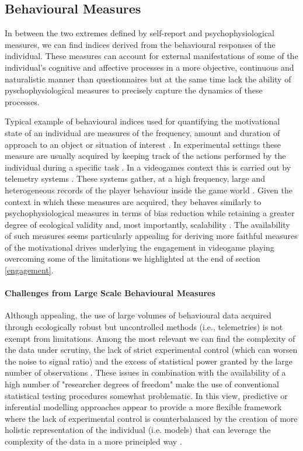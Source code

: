 \subsection{Behavioural Measures}
\label{behavioural_indices}
In between the two extremes defined by self-report and psychophysiological measures, we can find indices derived from the behavioural responses of the individual. These measures can account for external manifestations of some of the individual's cognitive and affective processes in a more objective, continuous and naturalistic manner than questionnaires but at the same time lack the ability of pyschophysiological measures to precisely capture the dynamics of these processes. 

Typical example of behavioural indices used for quantifying the motivational state of an individual are measures of the frequency, amount and duration of approach to an object or situation of interest \cite{berridge2004motivation, simpson2016behavioral}. In experimental settings these measure are usually acquired by keeping track of the actions performed by the individual during a specific task \cite{berridge2009dissecting, simpson2016behavioral}. In a videogames context this is carried out by telemetry systems \cite{el2016game}. These systems gather, at a high frequency,  large and heterogeneous records of the player behaviour inside the game world \cite{el2016game}. Given the context in which these measures are acquired, they behaves similarly to psychophysiological measures in terms of bias reduction while retaining a greater degree of ecological validity and, most importantly, scalability \cite{el2016game}. The availability of such measures seems particularly appealing for deriving more faithful measures of the motivational drives underlying the engagement in videogame playing overcoming some of the limitations we highlighted at the end of section \ref{engagement}.
    
\paragraph*{Challenges from Large Scale Behavioural Measures}
\label{challenges_large_scale}
Although appealing, the use of large volumes of behavioural data acquired through ecologically robust but uncontrolled methods (i.e., telemetries) is not exempt from limitations. Among the most relevant we can find the complexity of the data under scrutiny, the lack of strict experimental control (which can worsen the noise to signal ratio) and the excess of statistical power granted by the large number of observations \cite{orben2019association}. These issues in combination with the availability of a high number of "researcher degrees of freedom" \cite{simmons2016false} make the use of conventional statistical testing procedures somewhat problematic. In this view, predictive or inferential modelling approaches appear to provide a more flexible framework where the lack of experimental control is counterbalanced by the creation of more holistic representation of the individual (i.e. models) that can leverage the complexity of the data in a more principled way \cite{yannakakis2013player}.

